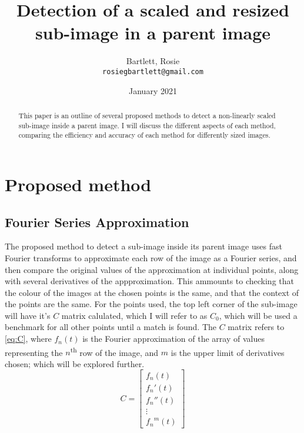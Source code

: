 \documentclass[twocolumn,twoside]{article}
\title{Detection of a scaled and resized sub-image in a parent image}
\date{January 2021}
\author{
  Bartlett, Rosie\\
  \texttt{rosiegbartlett@gmail.com}
}
\numberwithin{equation}{section}
\begin{document}
\maketitle
\begin{abstract}
This paper is an outline of several proposed methods to detect a non-linearly scaled sub-image inside a parent image. I will discuss the different aspects of each method, comparing the efficiency and accuracy of each method for differently sized images.
\end{abstract}
\section{Proposed method}
\subsection{Fourier Series Approximation}

The proposed method to detect a sub-image inside its parent image uses fast Fourier transforms to approximate each row of the image as a Fourier series, and then compare the original values of the approximation at individual points, along with several derivatives of the appproximation. This ammounts to checking that the colour of the images at the chosen points is the same, and that the context of the points are the same. For the points used, the top left corner of the sub-image will have it's $C$ matrix calulated, which I will refer to as $C_0$, which will be used a benchmark for all other points until a match is found. The $C$ matrix refers to \autoref{eq:C}, where $f_n(t)$ is the Fourier approximation of the array of values representing the $n$\textsuperscript{th} row of the image, and $m$ is the upper limit of derivatives chosen; which will be explored further.
\begin{equation}\label{eq:C}
  C=
  \begin{bmatrix}
    f_n(t)\\{f_n}'(t)\\{f_n}''(t)\\\vdots\\{f_n}^m(t)
  \end{bmatrix}
\end{equation}
\end{document}
